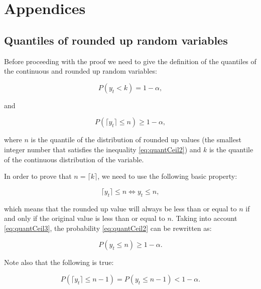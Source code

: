 \documentclass[]{elsarticle} %
\begin{document}
\hypertarget{appendices}{%
\section{Appendices}\label{appendices}}

\hypertarget{quantilesceiling}{%
\subsection{Quantiles of rounded up random variables}\label{quantilesceiling}}

Before proceeding with the proof we need to give the definition of the quantiles of the continuous and rounded up random variables:

\begin{equation} \label{eq:quantCeil1}
    P \left(y_t < k \right) = 1 - \alpha ,
\end{equation}

and

\begin{equation} \label{eq:quantCeil2}
    P \left(\lceil y_t \rceil \leq n \right) \geq 1 - \alpha ,
\end{equation}

where \(n\) is the quantile of the distribution of rounded up values (the smallest integer number that satisfies the inequality \eqref{eq:quantCeil2}) and \(k\) is the quantile of the continuous distribution of the variable.

In order to prove that \(n = \lceil k \rceil\), we need to use the following basic property:

\begin{equation} \label{eq:quantCeil3}
    \lceil y_t \rceil \leq n \iff  y_t \leq n,
\end{equation}

which means that the rounded up value will always be less than or equal to \(n\) if and only if the original value is less than or equal to \(n\). Taking into account \eqref{eq:quantCeil3}, the probability \eqref{eq:quantCeil2} can be rewritten as:

\begin{equation} \label{eq:quantCeil4}
    P \left(y_t \leq n \right) \geq 1 - \alpha .
\end{equation}

Note also that the following is true:

\begin{equation} \label{eq:quantCeil5}
    P \left(\lceil y_t \rceil \leq n-1 \right) = P \left(y_t \leq n-1 \right) < 1 - \alpha .
\end{equation}
\end{document}
